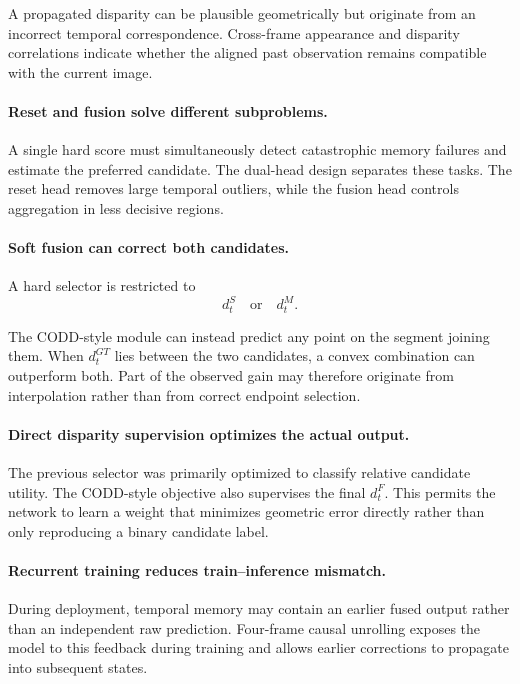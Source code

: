 \documentclass[11pt,a4paper]{article}
\begin{document}
A propagated disparity can be plausible geometrically but originate from an incorrect
temporal correspondence. Cross-frame appearance and disparity correlations indicate whether
the aligned past observation remains compatible with the current image.

\paragraph{Reset and fusion solve different subproblems.}

A single hard score must simultaneously detect catastrophic memory failures and estimate
the preferred candidate. The dual-head design separates these tasks. The reset head removes
large temporal outliers, while the fusion head controls aggregation in less decisive regions.

\paragraph{Soft fusion can correct both candidates.}

A hard selector is restricted to
\begin{equation}
    d_t^{S}
    \quad\text{or}\quad
    d_t^{M}.
\end{equation}

The CODD-style module can instead predict any point on the segment joining them. When
\(d_t^{GT}\) lies between the two candidates, a convex combination can outperform both.
Part of the observed gain may therefore originate from interpolation rather than from
correct endpoint selection.

\paragraph{Direct disparity supervision optimizes the actual output.}

The previous selector was primarily optimized to classify relative candidate utility.
The CODD-style objective also supervises the final \(d_t^{F}\). This permits the network
to learn a weight that minimizes geometric error directly rather than only reproducing a
binary candidate label.

\paragraph{Recurrent training reduces train--inference mismatch.}

During deployment, temporal memory may contain an earlier fused output rather than an
independent raw prediction. Four-frame causal unrolling exposes the model to this feedback
during training and allows earlier corrections to propagate into subsequent states.
\end{document}
